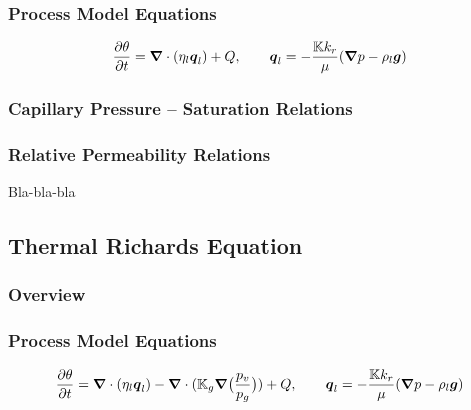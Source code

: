 \subsubsection{Process Model Equations} 
\label{sec:richards-model-equations}

\begin{equation}
  \frac{\partial \theta}{\partial t} 
  = {\boldsymbol{\nabla}} \cdot (\eta_l {\boldsymbol{q}}_l) + Q,
  \qquad
  {\boldsymbol{q}}_l = -\frac{{\mathbb K} k_r}{\mu} 
  ({\boldsymbol{\nabla}} p - \rho_l {\boldsymbol{g}})
\end{equation}

\subsubsection{Capillary Pressure -- Saturation Relations}  
\label{sec:pc_s_relations}

\subsubsection{Relative Permeability Relations}  
\label{sec:RelativePerm}

Bla-bla-bla


\subsection{Thermal Richards Equation}
\label{sec:thermal-richards-equation}

\subsubsection{Overview}
\label{sec:thermal-richards-overview}

\subsubsection{Process Model Equations} 
\label{sec:thermal-richards-model-equations}

\begin{equation}
  \frac{\partial \theta}{\partial t} 
  =
  {\boldsymbol{\nabla}} \cdot (\eta_l {\boldsymbol{q}}_l)
  - {\boldsymbol{\nabla}} \cdot ({\mathbb K}_g {\boldsymbol{\nabla}} \big(\frac{p_v}{p_g}\big)) + Q,
  \qquad
  {\boldsymbol{q}}_l = -\frac{{\mathbb K} k_r}{\mu} ({\boldsymbol{\nabla}} p - \rho_l {\boldsymbol{g}})
\end{equation}

